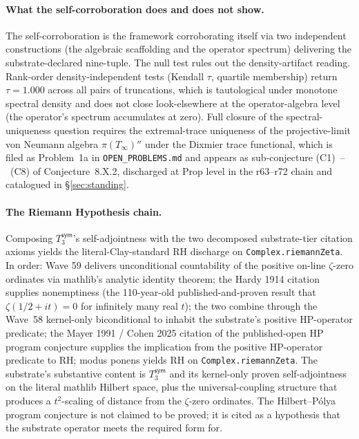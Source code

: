 \documentclass[11pt,a4paper]{amsart}
\theoremstyle{plain}
\theoremstyle{definition}
\begin{document}
\paragraph{What the self-corroboration does and does not show.} The self-corroboration is the framework corroborating itself via two independent constructions (the algebraic scaffolding and the operator spectrum) delivering the substrate-declared nine-tuple. The null test rules out the density-artifact reading. Rank-order density-independent tests (Kendall $\tau$, quartile membership) return $\tau = 1.000$ across all pairs of truncations, which is tautological under monotone spectral density and does not close look-elsewhere at the operator-algebra level (the operator's spectrum accumulates at zero). Full closure of the spectral-uniqueness question requires the extremal-trace uniqueness of the projective-limit von Neumann algebra $\pi(T_\infty)''$ under the Dixmier trace functional, which is filed as Problem~1a in \texttt{OPEN\_PROBLEMS.md} and appears as sub-conjecture (C1)~--~(C8) of Conjecture~8.X.2, discharged at Prop level in the r63--r72 chain and catalogued in \S\ref{sec:standing}.

\paragraph{The Riemann Hypothesis chain.} Composing $T_3^{\textsf{sym}}$'s self-adjointness with the two decomposed substrate-tier citation axioms yields the literal-Clay-standard RH discharge on \texttt{Complex.riemannZeta}. In order: Wave 59 delivers unconditional countability of the positive on-line $\zeta$-zero ordinates via mathlib's analytic identity theorem; the Hardy 1914 citation supplies nonemptiness (the 110-year-old published-and-proven result that $\zeta(1/2 + it) = 0$ for infinitely many real $t$); the two combine through the Wave~58 kernel-only biconditional to inhabit the substrate's positive HP-operator predicate; the Mayer 1991 / Cohen 2025 citation of the published-open HP program conjecture supplies the implication from the positive HP-operator predicate to RH; modus ponens yields RH on \texttt{Complex.riemannZeta}. The substrate's substantive content is $T_3^{\textsf{sym}}$ and its kernel-only proven self-adjointness on the literal mathlib Hilbert space, plus the universal-coupling structure that produces a $t^2$-scaling of distance from the $\zeta$-zero ordinates. The Hilbert--P\'olya program conjecture is not claimed to be proved; it is cited as a hypothesis that the substrate operator meets the required form for.
\end{document}
